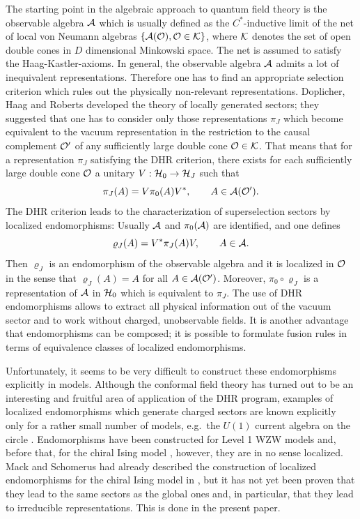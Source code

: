 \documentclass[10pt,a4paper]{article}
\begin{document}
The starting point in the algebraic approach to quantum
field theory is the observable algebra ${\cal A}$ which
is usually defined as the $C^*$-inductive limit of the
net of local von Neumann algebras
$\{{\cal A}({\cal O}),{\cal O}\in{\cal K}\}$, where
${\cal K}$ denotes the set of open double cones in $D$
dimensional Minkowski space. The net is assumed to
satisfy the Haag-Kastler-axioms. In general, the observable
algebra ${\cal A}$ admits a lot of inequivalent
representations. Therefore one has to find an appropriate
selection criterion which rules out the physically
non-relevant representations. Doplicher, Haag and Roberts
\cite{DHR1,DHR2,Haag} developed the theory of locally
generated sectors; they suggested that one has to consider
only those representations $\pi_J$ which become equivalent
to the vacuum representation in the restriction to the
causal complement ${\cal O}'$ of any sufficiently large
double cone ${\cal O}\in{\cal K}$. That means that for
a representation $\pi_J$ satisfying the DHR criterion,
there exists for each sufficiently large double cone
${\cal O}$ a unitary $V:{\cal H}_0\rightarrow{\cal H}_J$
such that
\[\pi_J(A)=V\pi_0(A)V^*,\qquad A\in{\cal A}({\cal O}').\]
The DHR criterion leads to the characterization of
superselection sectors by localized endomorphisms:
Usually ${\cal A}$ and $\pi_0({\cal A})$ are identified,
and one defines
\[ \varrho_J(A) = V^* \pi_J(A) V,\qquad A\in{\cal A}.\]
Then $\varrho_J$ is an endomorphism of the observable
algebra and it is localized in ${\cal O}$ in the sense
that $\varrho_J(A)=A$ for all $A\in{\cal A}({\cal O}')$.
Moreover, $\pi_0\circ\varrho_J$ is a representation of
${\cal A}$ in ${\cal H}_0$ which is equivalent to $\pi_J$.
The use of DHR endomorphisms allows to extract all
physical information out of the vacuum sector and to
work without charged, unobservable fields. It is another
advantage that endomorphisms can be composed; it is
possible to formulate fusion rules in terms of equivalence
classes of localized endomorphisms.

Unfortunately, it seems to be very difficult to construct
these endomorphisms explicitly in models. Although the
conformal field theory has turned out to be an interesting
and fruitful area of application of the DHR program,
examples of localized endomorphisms which generate
charged sectors are known explicitly only for a rather
small number of models, e.g.~the $U(1)$ current algebra
on the circle \cite{BMT}. Endomorphisms
have been constructed for Level 1 WZW models \cite{FGV} and,
before that, for the chiral Ising model \cite{MS1,MS2},
however, they are in no sense localized. Mack and Schomerus
had already described the construction of localized
endomorphisms for the chiral Ising model in \cite{MS1},
but it has not yet been proven that they lead
to the same sectors as the global ones and, in particular,
that they lead to irreducible representations. This is
done in the present paper.
\end{document}
